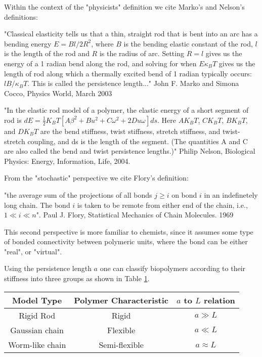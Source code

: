 Within the context of the "physicists" definition we cite Marko's
and Nelson's definitions:

"Classical elasticity tells us that a thin, straight rod that is bent
into an arc has a bending energy $E=Bl/2R^2$, where $B$ is the bending
elastic constant of the rod, $l$ is the length of the rod and $R$ is
the radius of arc. Setting $R=l$ gives us the energy of a 1 radian
bend along the rod, and solving for when $E \kappa_{B}T$ gives us the
length of rod along which a thermally excited bend of 1 radian
typically occurs: $l B/\kappa_{B}T$. This is called the persistence
length..." John F. Marko and Simona Cocco, Physics World, March 2003

"In the elastic rod model of  a polymer, the elastic energy of a short
segment       of       rod       is       $dE=\frac{1}{2}       K_{B}T
[A\beta^2+Bu^2+C\omega^2+2Du\omega]  ds$.  Here $AK_{B}T$,  $CK_{B}T$,
$BK_{B}T$,  and $DK_{B}T$  are  the bend  stiffness, twist  stiffness,
stretch stiffness, and twist-stretch coupling, and ds is the length of
the segment.  (The quantities  A and  C are also  called the  bend and
twist  persistence  lengths.)"   Philip  Nelson,  Biological  Physics:
Energy, Information, Life, 2004.

From the "stochastic" perspective we cite Flory's definition:

"the average sum of the projections of all bonds $ j \geq i$  on bond
$i$ in an indefinetely long chain. The bond $i$ is taken to be remote
from either end of the chain, i.e., $1 \ll i \ll n$". Paul J. Flory,
Statistical Mechanics of Chain Molecules. 1969

This second perspective is more familiar to chemists, since it assumes
some type  of bonded connectivity  between polymeric units,  where the
bond can be either "real", or "virtual".

Using the persistence length $a$ one can classify biopolymers according to
their stiffness into three groups as shown in Table \ref{tab:pers}. 

\begin{table}[htbp]
\begin{center}  
\begin{tabular}{c|c|c}
\hline
Model Type      & Polymer Characteristic & $a$ to $L$ relation\\ \hline
Rigid Rod       & Rigid          &        $a \gg L$   \\
Gaussian chain  & Flexible       &        $a \ll L$   \\
Worm-like chain & Semi-flexible  &    $a \approx L$ \\
\hline
\end{tabular}
\label{tab:pers}
\end{center}
\end{table}











